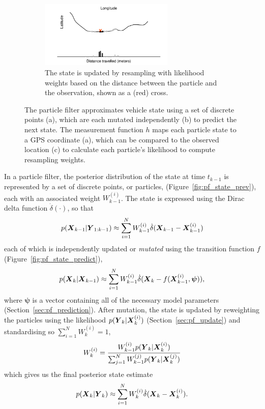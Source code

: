 \begin{figure}[p]
    \begin{subfigure}[t]{0.9\textwidth}
        \centering
        \includegraphics[width=0.7\textwidth]{figures/03_particle_filter_4.pdf}
        \caption{
            The state is updated by resampling with likelihood weights based on the distance
            between the particle and the observation, shown as a (red) cross.
        }
        \label{fig:pf_state_predict2}
    \end{subfigure}
    \caption{
        The particle filter approximates vehicle state using a set of 
        discrete points (a), which are each mutated independently (b)
        to predict the next state.
        The measurement function $h$ maps each particle state
        to a GPS coordinate (a),
        which can be compared to the observed location (c)
        to calculate each particle's likelihood to compute resampling weights.
    }
    \label{fig:pf_state}
\end{figure}

\afterpage{\clearpage}

In a particle filter, the posterior distribution of the state at time $t_{k-1}$
is represented by a set of discrete points, or particles, (Figure~\ref{fig:pf_state_prev}),
each with an associated weight $W_{k-1}^{(i)}$.
The state is expressed using the Dirac delta function $\dot\delta(\cdot)$,
so that
\begin{equation*}
p(\mbox{$\boldsymbol{X}$}_{k-1} | \mbox{$\boldsymbol{Y}$}_{1:k-1}) \approx 
    \sum_{i=1}^N W_{k-1}^{(i)} \dot\delta(\mbox{$\boldsymbol{X}$}_{k-1} - \mbox{$\boldsymbol{X}$}_{k-1}^{(i)})
\end{equation*}
each of which is independently updated or \emph{mutated} using the transition function $f$ (Figure~\ref{fig:pf_state_predict}),
\begin{equation*}
p(\mbox{$\boldsymbol{X}$}_k | \mbox{$\boldsymbol{X}$}_{k-1}) \approx 
    \sum_{i=1}^N W_{k-1}^{(i)} \dot\delta(\mbox{$\boldsymbol{X}$}_{k} - f(\mbox{$\boldsymbol{X}$}_{k-1}^{(i)}, \boldsymbol{\psi})),
\end{equation*}
where $\boldsymbol{\psi}$ is a vector containing all of the necessary model parameters
(Section~\ref{sec:pf_prediction}).
After mutation, 
the state is updated by reweighting the particles using the likelihood $p(\mbox{$\boldsymbol{Y}$}_k | \mbox{$\boldsymbol{X}$}_k^{(i)})$ 
(Section~\ref{sec:pf_update}) and standardising so $\sum_{i=1}^N W_k^{(i)} = 1$,
\begin{equation*}
W_k^{(i)} = \frac{W_{k-1}^{(i)} p(\mbox{$\boldsymbol{Y}$}_k | \mbox{$\boldsymbol{X}$}_k^{(i)})}{
    \sum_{j=1}^N W_{k-1}^{(j)} p(\mbox{$\boldsymbol{Y}$}_k | \mbox{$\boldsymbol{X}$}_k^{(j)})
}
\end{equation*}
which gives us the final posterior state estimate
\begin{equation*}
p(\mbox{$\boldsymbol{X}$}_k | \mbox{$\boldsymbol{Y}$}_k) \approx  
    \sum_{i=1}^N W_{k}^{(i)} \dot\delta(\mbox{$\boldsymbol{X}$}_{k} - \mbox{$\boldsymbol{X}$}_{k}^{(i)}).
\end{equation*}

